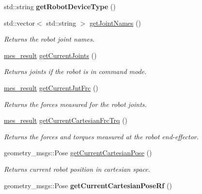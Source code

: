 \begin{DoxyCompactItemize}
\item 
std\+::string {\bfseries get\+Robot\+Device\+Type} ()\hypertarget{classkukadu_1_1KukieControlQueue_ad62cd51305bd1ac8b5da9629b7f3116f}{}\label{classkukadu_1_1KukieControlQueue_ad62cd51305bd1ac8b5da9629b7f3116f}

\item 
std\+::vector$<$ std\+::string $>$ \hyperlink{classkukadu_1_1KukieControlQueue_af3c7ff340cd44a44233c209eeed9d929}{get\+Joint\+Names} ()
\begin{DoxyCompactList}\small\item\em Returns the robot joint names. \end{DoxyCompactList}\item 
\hyperlink{structmes__result}{mes\+\_\+result} \hyperlink{classkukadu_1_1KukieControlQueue_aecf704318e729f49999d3be51262f068}{get\+Current\+Joints} ()
\begin{DoxyCompactList}\small\item\em Returns joints if the robot is in command mode. \end{DoxyCompactList}\item 
\hyperlink{structmes__result}{mes\+\_\+result} \hyperlink{classkukadu_1_1KukieControlQueue_a947d5f2d42060bdd6d7271d80ac40e7a}{get\+Current\+Jnt\+Frc} ()
\begin{DoxyCompactList}\small\item\em Returns the forces measured for the robot joints. \end{DoxyCompactList}\item 
\hyperlink{structmes__result}{mes\+\_\+result} \hyperlink{classkukadu_1_1KukieControlQueue_af9999c0af6059520452f0d42a8db4527}{get\+Current\+Cartesian\+Frc\+Trq} ()
\begin{DoxyCompactList}\small\item\em Returns the forces and torques measured at the robot end-\/effector. \end{DoxyCompactList}\item 
geometry\+\_\+msgs\+::\+Pose \hyperlink{classkukadu_1_1KukieControlQueue_ab13290e3512b3a1ab10660b0f60e6961}{get\+Current\+Cartesian\+Pose} ()
\begin{DoxyCompactList}\small\item\em Returns current robot position in cartesian space. \end{DoxyCompactList}\item 
geometry\+\_\+msgs\+::\+Pose {\bfseries get\+Current\+Cartesian\+Pose\+Rf} ()\hypertarget{classkukadu_1_1KukieControlQueue_a4ecef16deac6daa191d942cf00526550}{}\label{classkukadu_1_1KukieControlQueue_a4ecef16deac6daa191d942cf00526550}


\end{DoxyCompactItemize}
